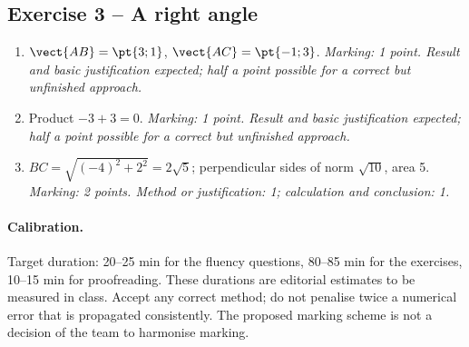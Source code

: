 \subsection*{Exercise 3 -- A right angle}
\begin{enumerate}
\item $\vect{AB}=\pt{3;1}$, $\vect{AC}=\pt{-1;3}$. \textit{Marking: 1 point. Result and basic justification expected; half a point possible for a correct but unfinished approach.}
\item Product $-3+3=0$. \textit{Marking: 1 point. Result and basic justification expected; half a point possible for a correct but unfinished approach.}
\item $BC=\sqrt{(-4)^2+2^2}=2\sqrt5$; perpendicular sides of norm $\sqrt{10}$, area 5. \textit{Marking: 2 points. Method or justification: 1; calculation and conclusion: 1.}
\end{enumerate}
\paragraph{Calibration.} Target duration: 20--25 min for the fluency questions, 80--85 min for the exercises, 10--15 min for proofreading. These durations are editorial estimates to be measured in class. Accept any correct method; do not penalise twice a numerical error that is propagated consistently. The proposed marking scheme is not a decision of the team to harmonise marking.
